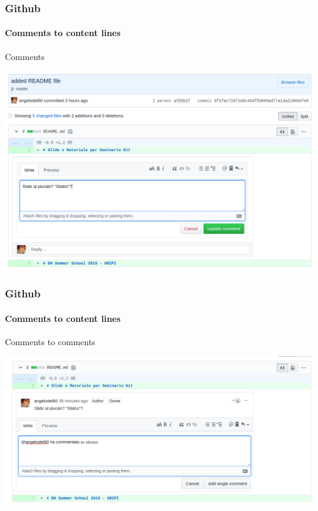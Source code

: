 \begin{frame}
		\frametitle{Github}
		\framesubtitle{Comments to content lines}
		\addtocounter{nframe}{1}
		
		\begin{block}{Comments}
			\begin{center}
				\includegraphics[width=.9\textwidth]{imgs/github-Commento-codice.png}
			\end{center}
		\end{block}

\end{frame}

\begin{frame}
	\frametitle{Github}
	\framesubtitle{Comments to content lines}
	\addtocounter{nframe}{1}
	
	\begin{block}{Comments to comments}
		\begin{center}
			\includegraphics[width=.9\textwidth]{imgs/github-CommentoNotifica.png}
		\end{center}
	\end{block}

\end{frame}
	

